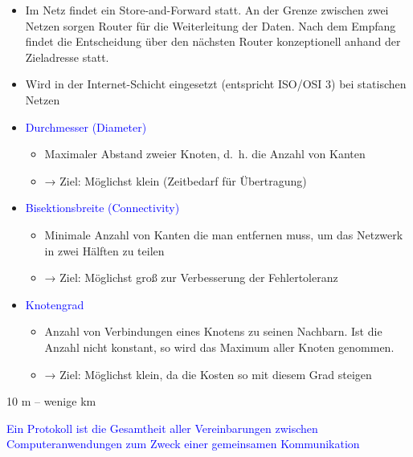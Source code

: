\begin{itemize}
    \item Im Netz findet ein Store-and-Forward statt.
    An der Grenze zwischen zwei Netzen sorgen Router für die Weiterleitung der Daten.
    Nach dem Empfang findet die Entscheidung über den nächsten Router konzeptionell anhand der Zieladresse statt.
    \item Wird in der Internet-Schicht eingesetzt (entspricht ISO/OSI 3) bei statischen Netzen
\end{itemize}

\begin{itemize}
    \item \textcolor{blue}{Durchmesser (Diameter)}
    \begin{itemize}
        \item Maximaler Abstand zweier Knoten, d.\ h. die Anzahl von Kanten
        \item → Ziel: Möglichst klein (Zeitbedarf für Übertragung)
    \end{itemize}
    \item \textcolor{blue}{Bisektionsbreite (Connectivity)}
    \begin{itemize}
        \item Minimale Anzahl von Kanten die man entfernen muss, um das Netzwerk in zwei Hälften zu teilen
        \item → Ziel: Möglichst groß zur Verbesserung der Fehlertoleranz
    \end{itemize}
    \item \textcolor{blue}{Knotengrad}
    \begin{itemize}
        \item Anzahl von Verbindungen eines Knotens zu seinen Nachbarn.
        Ist die Anzahl nicht konstant, so wird das Maximum aller Knoten genommen.
        \item → Ziel: Möglichst klein, da die Kosten so mit diesem Grad steigen
    \end{itemize}
\end{itemize}

10 m – wenige km

\textcolor{blue}{Ein Protokoll ist die Gesamtheit aller Vereinbarungen zwischen Computeranwendungen zum Zweck einer gemeinsamen Kommunikation}

